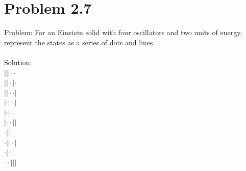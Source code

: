 \documentclass[paper=a4, fontsize=11pt]{scrartcl} %
\numberwithin{equation}{section} %
\numberwithin{figure}{section} %
\numberwithin{table}{section} %
\begin{document}
\section*{Problem 2.7}
Problem: For an Einstein solid with four oscillators and two units of energy, represent the
states as a series of dots and lines.
\\
\\
Solution:\\
$|||\cdot\cdot$\\
$||\cdot|\cdot$\\
$||\cdot\cdot|$\\
$|\cdot|\cdot|$\\
$|\cdot||\cdot$\\
$|\cdot\cdot||$\\
$\cdot|||\cdot$\\
$\cdot||\cdot|$\\
$\cdot|\cdot||$\\
$\cdot\cdot|||$\\
\end{document}
